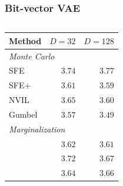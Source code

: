 \documentclass[xetex,aspectratio=169,xcolor,professionalfonts,hyperref]{beamer}
\begin{document}
\begin{frame}
    \frametitle{Bit-vector VAE}
    \begin{columns}[T]
        \begin{column}{.53\textwidth}
            \centering\small%
            \begin{tabular}{lrr}
                \toprule
                Method                                    & $D=32$ & $D=128$ \\
                \midrule
                \multicolumn{3}{l}{\emph{Monte Carlo}}                       \\
                SFE                                       & $3.74$ & $3.77$  \\
                SFE$+$                                    & $3.61$ & $3.59$  \\
                NVIL                                      & $3.65$ & $3.60$  \\
                Gumbel                                    & $3.57$ & $3.49$  \\
                \midrule
                \multicolumn{3}{l}{\emph{Marginalization}}                   \\
                \color{tVividBlue}{Top-$k$ sparsemax}     & $3.62$ & $3.61$  \\
                \color{tVividBlue}{SparseMAP}             & $3.72$ & $3.67$  \\
                \color{tVividBlue}{SparseMAP (w/ budget)} & $3.64$ & $3.66$  \\
                \bottomrule
            \end{tabular}
        \end{column}
        \begin{column}{.47\textwidth}
            \centering%
            \only<3>{
                
            }
        \end{column}
    \end{columns}
\end{frame}
\end{document}
